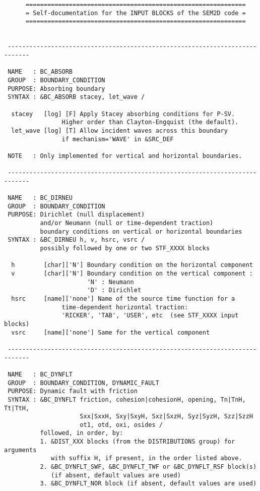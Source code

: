 \begin{verbatim}
      =============================================================
      = Self-documentation for the INPUT BLOCKS of the SEM2D code =
      =============================================================
 
 
 ----------------------------------------------------------------------------

 NAME   : BC_ABSORB
 GROUP  : BOUNDARY_CONDITION
 PURPOSE: Absorbing boundary
 SYNTAX : &BC_ABSORB stacey, let_wave /

  stacey   [log] [F] Apply Stacey absorbing conditions for P-SV.
                Higher order than Clayton-Engquist (the default).
  let_wave [log] [T] Allow incident waves across this boundary 
                if mechanism='WAVE' in &SRC_DEF

 NOTE   : Only implemented for vertical and horizontal boundaries.

 ----------------------------------------------------------------------------

 NAME   : BC_DIRNEU
 GROUP  : BOUNDARY_CONDITION
 PURPOSE: Dirichlet (null displacement) 
          and/or Neumann (null or time-dependent traction) 
          boundary conditions on vertical or horizontal boundaries
 SYNTAX : &BC_DIRNEU h, v, hsrc, vsrc /
          possibly followed by one or two STF_XXXX blocks

  h        [char]['N'] Boundary condition on the horizontal component
  v        [char]['N'] Boundary condition on the vertical component :
                       'N' : Neumann 
                       'D' : Dirichlet
  hsrc     [name]['none'] Name of the source time function for a
                time-dependent horizontal traction: 
                'RICKER', 'TAB', 'USER', etc  (see STF_XXXX input blocks)
  vsrc     [name]['none'] Same for the vertical component

 ----------------------------------------------------------------------------

 NAME   : BC_DYNFLT
 GROUP  : BOUNDARY_CONDITION, DYNAMIC_FAULT
 PURPOSE: Dynamic fault with friction
 SYNTAX : &BC_DYNFLT friction, cohesion|cohesionH, opening, Tn|TnH, Tt|TtH,
                     Sxx|SxxH, Sxy|SxyH, Sxz|SxzH, Syz|SyzH, Szz|SzzH
                     ot1, otd, oxi, osides /
          followed, in order, by:
          1. &DIST_XXX blocks (from the DISTRIBUTIONS group) for arguments
             with suffix H, if present, in the order listed above.
          2. &BC_DYNFLT_SWF, &BC_DYNFLT_TWF or &BC_DYNFLT_RSF block(s) 
             (if absent, default values are used)
          3. &BC_DYNFLT_NOR block (if absent, default values are used)


\end{verbatim}
